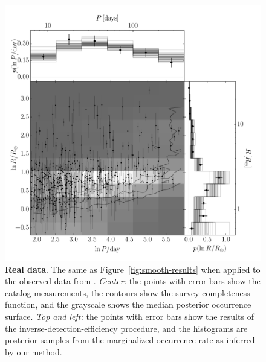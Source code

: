 \documentclass[12pt,preprint]{aastex}
\newcommand{\figref}[1]{\ref{fig:#1}}
\newcommand{\Fig}[1]{Figure~\figref{#1}}
\newcommand{\fig}[1]{\Fig{#1}}
\newcommand{\figlabel}[1]{\label{fig:#1}}
\begin{document}
\begin{figure}[p]
\begin{center}
\includegraphics[width=\textwidth]{figures/results/results.pdf}
\end{center}
\caption{%
{\bf Real data}.
The same as \fig{smooth-results} when applied to the observed data from
\citet{petigura}.
\emph{Center:} the points with error bars show the catalog measurements, the
contours show the survey completeness function, and the grayscale shows the
median posterior occurrence surface.
\emph{Top and left:} the points with error bars show the results of the
inverse-detection-efficiency procedure, and the histograms are posterior
samples from the marginalized occurrence rate as inferred by our method.
\figlabel{real-results}}
\end{figure}
\end{document}
